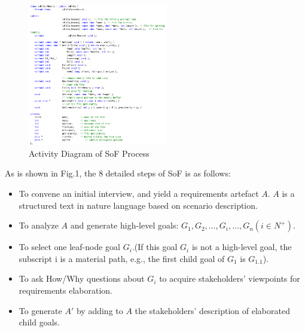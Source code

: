 ﻿\documentclass{beamer}
\begin{document}
\begin{frame}          %
  \begin{figure}
    \includegraphics[width=2.4in]{img/2.PNG}
    \caption{Activity Diagram of SoF Process}
  \end{figure}
\end{frame}

\begin{frame}    {As is shown in Fig.1, the 8 detailed steps of SoF is as follows:}        %
  \small{
  \begin{itemize}
  \item %
    To convene an initial interview, and yield a requirements artefact  $A$. $A$ is a structured text in nature language based on scenario description.\pause
  \item %
    To analyze $A$ and generate high-level goals: $G_1, G_2, \ldots, G_i, \ldots, G_n (i\in N^+)$. \pause
  \item %
    To select one leaf-node goal $G_i$.(If this goal $G_i$ is not a high-level goal, the subscript i is a material path, e.g., the first child goal of $G_1$ is $G_{1.1}$). \pause
  \item %
    To ask How/Why questions about $G_i$ to acquire stakeholders' viewpoints for requirements elaboration.\pause
  \item %
    To generate $A'$ by adding to $A$ the stakeholders' description of elaborated child goals.\pause
  \end{itemize}
  }
\end{frame}
\end{document}
